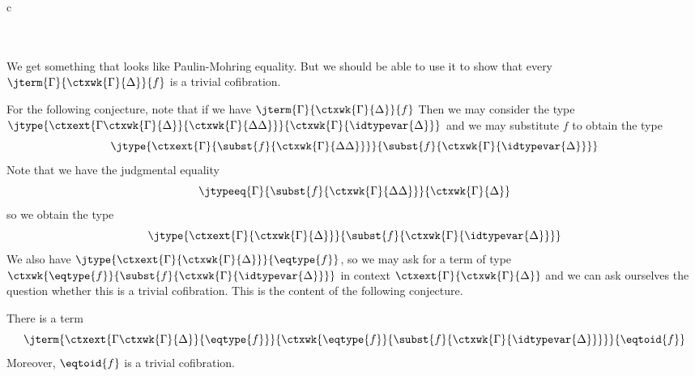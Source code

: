 \begin{infarray}{c}
\\
\\
          {}\\
          {}
\end{infarray}

We get something that looks like Paulin-Mohring equality. But we should be able to use it to
show that every $\jterm{\Gamma}{\ctxwk{\Gamma}{\Delta}}{f}$ is a trivial cofibration.

For the following conjecture, note that if we have $\jterm{\Gamma}{\ctxwk{\Gamma}{\Delta}}{f}$
Then we may consider the type $\jtype{\ctxext{{\Gamma}{\ctxwk{\Gamma}{\Delta}}}{\ctxwk{\Gamma}{{\Delta}{\Delta}}}}
{\ctxwk{\Gamma}{\idtypevar{\Delta}}}$ and we may substitute $f$ to obtain the type
\begin{equation*}
\jtype{\ctxext{\Gamma}{\subst{f}{\ctxwk{\Gamma}{{\Delta}{\Delta}}}}}
{\subst{f}{\ctxwk{\Gamma}{\idtypevar{\Delta}}}}
\end{equation*}
Note that we have the judgmental equality
\begin{equation*}
\jtypeeq{\Gamma}{\subst{f}{\ctxwk{\Gamma}{{\Delta}{\Delta}}}}{\ctxwk{\Gamma}{\Delta}}
\end{equation*}
so we obtain the type
\begin{equation*}
\jtype{\ctxext{\Gamma}{\ctxwk{\Gamma}{\Delta}}}
{\subst{f}{\ctxwk{\Gamma}{\idtypevar{\Delta}}}}
\end{equation*}
We also have $\jtype{\ctxext{\Gamma}{\ctxwk{\Gamma}{\Delta}}}{\eqtype{f}}$, so we
may ask for a term of type $\ctxwk{\eqtype{f}}{\subst{f}{\ctxwk{\Gamma}{\idtypevar{\Delta}}}}$
in context $\ctxext{\Gamma}{\ctxwk{\Gamma}{\Delta}}$ and we can ask ourselves the question
whether this is a trivial cofibration. This is the content of the following conjecture.

\begin{conj}
There is a term
\begin{equation*}
\jterm{\ctxext{{\Gamma}{\ctxwk{\Gamma}{\Delta}}}{\eqtype{f}}}{\ctxwk{\eqtype{f}}{\subst{f}{\ctxwk{\Gamma}{\idtypevar{\Delta}}}}}{\eqtoid{f}}
\end{equation*}
Moreover, $\eqtoid{f}$ is a trivial cofibration.
\end{conj}


